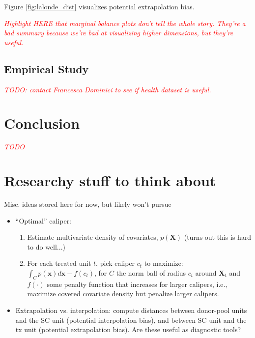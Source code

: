 \documentclass{article}
\newcommand{\bX}{\mathbf{X}}
\newcommand{\Xt}{\mathbf{X}_t}
\newcommand{\note}[1]{\textcolor{red}{\textit{#1}}}
\begin{document}
Figure \ref{fig:lalonde_dist} visualizes potential extrapolation bias.

\note{Highlight HERE that marginal balance plots don't tell the whole story. They're a bad summary because we're bad at visualizing higher dimensions, but they're useful.}


\subsection{Empirical Study}

\note{TODO: contact Francesca Dominici to see if health dataset is useful.}

\section{Conclusion}

\note{TODO}


\section{Researchy stuff to think about}

Misc. ideas stored here for now, but likely won't pursue
\begin{itemize}
    \item ``Optimal'' caliper:
    \begin{enumerate}
        \item Estimate multivariate density of covariates, $p(\bX)$ (turns out this is hard to do well...)
        \item For each treated unit $t$, pick caliper $c_t$ to maximize:
            $\int_{C} p(\mathbf{x})d\mathbf{x} - f(c_t)$, for $C$ the norm ball of radius $c_t$ around $\Xt$ and $f(\cdot)$ some penalty function that increases for larger calipers, i.e., maximize covered covariate density but penalize larger calipers.
    \end{enumerate}
    \item Extrapolation vs. interpolation: compute distances between donor-pool units and the SC unit (potential interpolation bias), and between SC unit and the tx unit (potential extrapolation bias). Are these useful as diagnostic tools?
\end{itemize}
\end{document}
